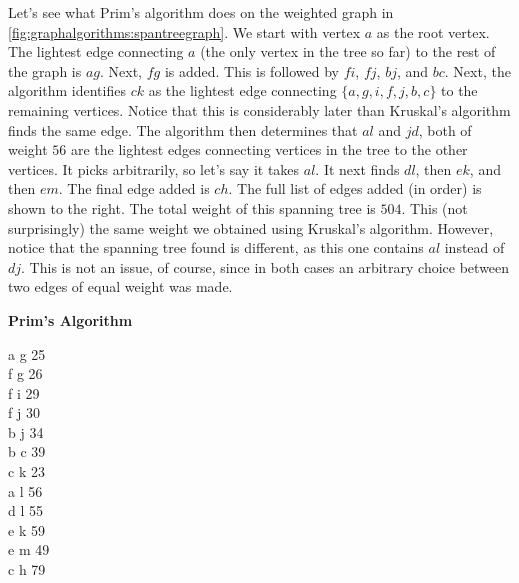 \medskip
\noindent\begin{minipage}{0.70\textwidth}
\begin{example}
  Let's see what Prim's algorithm does on the weighted graph in
  \autoref{fig:graphalgorithms:spantreegraph}. We start with vertex
  $a$ as the root vertex. The lightest edge connecting $a$ (the only
  vertex in the tree so far) to the rest of the graph is $ag$. Next,
  $fg$ is added. This is followed by $fi$, $fj$, $bj$, and $bc$. Next,
  the algorithm identifies $ck$ as the lightest edge connecting
  $\{a,g,i,f,j,b,c\}$ to the remaining vertices. Notice that this is
  considerably later than Kruskal's algorithm finds the same edge. The
  algorithm then determines that $al$ and $jd$, both of weight $56$
  are the lightest edges connecting vertices in the tree to the other
  vertices. It picks arbitrarily, so let's say it takes $al$. It next
  finds $dl$, then $ek$, and then $em$. The final edge added is $ch$. The full
  list of edges added (in order) is shown to the right. The total
  weight of this spanning tree is $504$. This (not surprisingly) the
  same weight we obtained using Kruskal's algorithm. However, notice
  that the spanning tree found is different, as this one contains
  $al$ instead of $dj$. This is not an issue, of course, since in
  both cases an arbitrary choice between two edges of equal weight
  was made.\end{example}
\end{minipage}\hspace{.03\textwidth}
\begin{minipage}{.25\textwidth}
\begin{center}\textbf{Prim's Algorithm}\\

\medskip
\begin{tt}
a g 25\\
f g 26\\
f i 29\\
f j 30\\
b j 34\\
b c 39\\
c k 23\\
a l 56\\
d l 55\\
e k 59\\
e m 49\\
c h 79
\end{tt}\end{center}\end{minipage}

